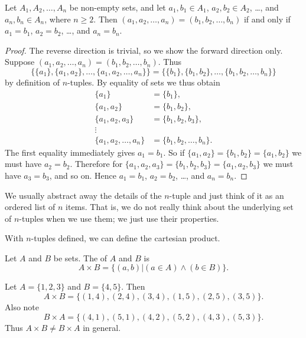 \begin{proposition}
    Let $A_1, A_2, \dots, A_n$ be non-empty sets, and let $a_1, b_1 \in A_1$, $a_2, b_2 \in A_2$, \dots, and $a_n, b_n \in A_n$, where $n \geq 2$. Then $(a_1, a_2, \dots, a_n) = (b_1, b_2, \dots, b_n)$ if and only if $a_1 = b_1$, $a_2 = b_2$, \dots, and $a_n = b_n$.
\end{proposition}
\begin{proof}
    The reverse direction is trivial, so we show the forward direction only. Suppose $(a_1, a_2, \dots, a_n) = (b_1, b_2, \dots, b_n)$. Thus
    \[
        \{\{a_1\}, \{a_1, a_2\}, \dots, \{a_1, a_2, \dots, a_n\}\} = \{\{b_1\}, \{b_1, b_2\}, \dots, \{b_1, b_2, \dots, b_n\}\}
    \]
    by definition of $n$-tuples. By equality of sets we thus obtain
    \begin{align*}
        \{a_1\} &= \{b_1\},\\
        \{a_1, a_2\} &= \{b_1, b_2\},\\
        \{a_1, a_2, a_3\} &= \{b_1, b_2, b_3\},\\
        \vdots\\
        \{a_1, a_2, \dots, a_n\} &= \{b_1, b_2, \dots, b_n\}.
    \end{align*}
    The first equality immediately gives $a_1 = b_1$. So if $\{a_1, a_2\} = \{b_1, b_2\} = \{a_1, b_2\}$ we must have $a_2 = b_2$. Therefore for $\{a_1, a_2, a_3\} = \{b_1, b_2, b_3\} = \{a_1, a_2, b_3\}$ we must have $a_3 = b_3$, and so on. Hence $a_1 = b_1$, $a_2 = b_2$, \dots, and $a_n = b_n$.
\end{proof}

We usually abstract away the details of the $n$-tuple and just think of it as an ordered list of $n$ items. That is, we do not really think about the underlying set of $n$-tuples when we use them; we just use their properties.

With $n$-tuples defined, we can define the cartesian product.

\begin{definition}
    Let $A$ and $B$ be sets. The  of $A$ and $B$ is
    \[
        A \times B = \{(a, b) \vert (a \in A) \land (b \in B)\}.
    \]
\end{definition}

\begin{example}
    Let $A = \{1, 2, 3\}$ and $B = \{4, 5\}$. Then
    \[
        A \times B = \{(1, 4), (2, 4), (3, 4), (1, 5), (2, 5), (3, 5)\}.
    \]
    Also note
    \[
        B \times A = \{(4, 1), (5, 1), (4, 2), (5, 2), (4, 3), (5, 3)\}.
    \]
    Thus $A \times B \neq B \times A$ in general.
\end{example}

